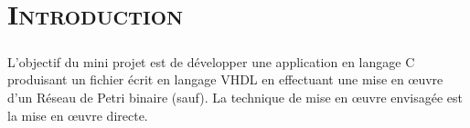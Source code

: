 \chapter*{\textsc{Introduction}}

	\paragraph{} L'objectif du mini projet est de développer une application en langage C produisant un fichier écrit en langage VHDL en effectuant une mise en œuvre d'un Réseau de Petri binaire (sauf). La technique de mise en œuvre envisagée est la mise en œuvre directe.
	 